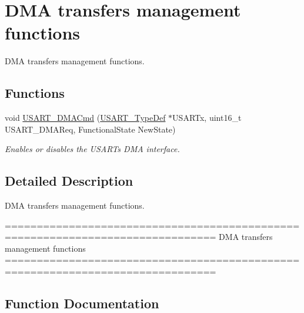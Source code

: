 \hypertarget{group___u_s_a_r_t___group8}{}\section{D\+MA transfers management functions}
\label{group___u_s_a_r_t___group8}


D\+MA transfers management functions.  


\subsection*{Functions}
\begin{DoxyCompactItemize}
\item 
void \hyperlink{group___u_s_a_r_t___group8_ga902857f199ebfba21c63d725354af66f}{U\+S\+A\+R\+T\+\_\+\+D\+M\+A\+Cmd} (\hyperlink{struct_u_s_a_r_t___type_def}{U\+S\+A\+R\+T\+\_\+\+Type\+Def} $\ast$U\+S\+A\+R\+Tx, uint16\+\_\+t U\+S\+A\+R\+T\+\_\+\+D\+M\+A\+Req, Functional\+State New\+State)
\begin{DoxyCompactList}\small\item\em Enables or disables the U\+S\+A\+RT\textquotesingle{}s D\+MA interface. \end{DoxyCompactList}\end{DoxyCompactItemize}


\subsection{Detailed Description}
D\+MA transfers management functions. 

\begin{DoxyVerb} ===============================================================================
                      DMA transfers management functions
 ===============================================================================  \end{DoxyVerb}
 

\subsection{Function Documentation}
